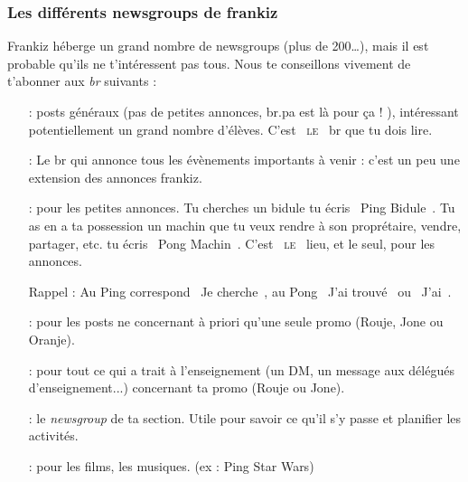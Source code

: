 \subsubsection{Les différents newsgroups de frankiz}
Frankiz héberge un grand nombre de newsgroups (plus de 200\dots ), mais il est probable qu'ils ne t'intéressent pas tous.
Nous te conseillons vivement de t'abonner aux \emph{br} suivants :
\begin{itemize}
\item[\ngname{br.eleves} :] posts généraux (pas de petites annonces, br.pa est là pour ça ! ), intéressant potentiellement un grand nombre d'élèves. C'est \guillemotleft{}~\textsc{le}~\guillemotright{} br que tu dois lire.

\item[\ngname{br.eleves.evenements} :] Le br qui annonce tous les évènements importants à venir : c'est un peu une extension des annonces frankiz.
	 
\item[\ngname{br.pa} :] pour les petites annonces. Tu cherches un bidule tu écris \guillemotleft{}~Ping Bidule~\guillemotright{}. Tu as en a ta possession un machin que tu veux rendre à son proprétaire, vendre, partager, etc. tu écris \guillemotleft{}~Pong Machin~\guillemotright{}. C'est \guillemotleft{}~\textsc{le}~\guillemotright{} lieu, et le seul, pour les annonces.

\smallskip

Rappel : Au Ping correspond \guillemotleft{}~Je cherche~\guillemotright{}, au Pong \guillemotleft{}~J'ai trouvé~\guillemotright{} ou \guillemotleft{}~J'ai~\guillemotright{}.

\smallskip


\item[\ngname{br.promo.ta\_promo} :] pour les posts ne concernant à priori qu'une seule promo (Rouje, Jone ou Oranje).
	 
 \item[\ngname{br.enseignement.*} :] pour tout ce qui a trait à l'enseignement (un DM, un message aux délégués d'enseignement...) concernant ta promo (Rouje ou Jone).
 
 \item[\ngname{br.section.ta\_section\_sportive} :] le \emph{newsgroup} de ta section.                                        Utile pour savoir ce qu'il s'y passe et planifier les activités.

\item[\ngname{br.informatique.media.request} :] pour les films, les musiques. (ex : Ping Star Wars)


\end{itemize}
